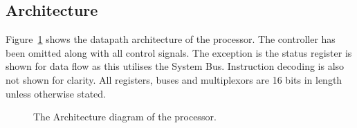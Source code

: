 \subsection{Architecture}

Figure~\ref{fig:architecture} shows the datapath architecture of the \samurai{} processor. 
The controller has been omitted along with all control signals. 
The exception is the status register is shown for data flow as this utilises the System Bus. 
Instruction decoding is also not shown for clarity. 
All registers, buses and multiplexors are 16 bits in length unless otherwise stated. 

\begin{figure}
\caption{The Architecture diagram of the \samurai{} processor.}
\label{fig:architecture}
\end{figure}
